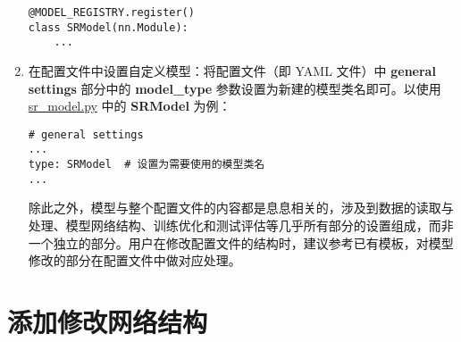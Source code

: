 \documentclass[../main.tex]{subfiles}
\begin{document}
\begin{enumerate}[第 1 步]
\begin{verbatim}
@MODEL_REGISTRY.register()
class SRModel(nn.Module):
    ...
\end{verbatim}

    \item 在配置文件中设置自定义模型：将配置文件（即 YAML 文件）中 \textbf{general settings} 部分中的 \textbf{model\_type} 参数设置为新建的模型类名即可。以使用 \href{https://github.com/XPixelGroup/BasicSR/tree/master/basicsr/models/sr_model.py}{sr\_model.py} 中的 \textbf{SRModel} 为例：

\begin{verbatim}
# general settings
...
type: SRModel  # 设置为需要使用的模型类名
...
\end{verbatim}
            除此之外，模型与整个配置文件的内容都是息息相关的，涉及到数据的读取与处理、模型网络结构、训练优化和测试评估等几乎所有部分的设置组成，而非一个独立的部分。用户在修改配置文件的结构时，建议参考已有模板，对模型修改的部分在配置文件中做对应处理。

\end{enumerate}

\section{添加修改网络结构}\label{howto:add_arch}
\end{document}
